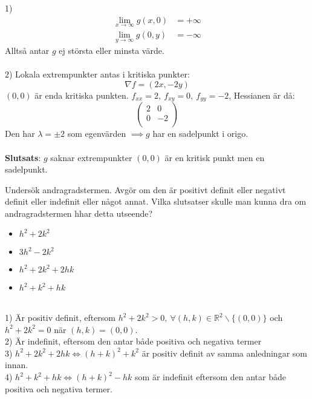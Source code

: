 \documentclass{report}
\begin{document}
{
1)
\begin{align*}
	\lim_{x \to \infty} g(x,0) &= + \infty\\
	\lim_{y \to \infty} g(0,y) &= - \infty
\end{align*}
Alltså antar $ g $ ej största eller minsta värde.\\\\

2) Lokala extrempunkter antas i kritiska punkter:
\begin{equation*}
\nabla f = (2x, -2y)
\end{equation*}
$ (0,0) $ är enda kritiska punkten. $ f_{xx} = 2, \: f_{xy} = 0, \: f_{yy} = -2 $, Hessianen är då:
\begin{equation*}
\begin{pmatrix}
	2 & 0 \\
	0 & -2 \\
\end{pmatrix}
\end{equation*}
Den har $ \lambda = \pm 2 $ som egenvärden $ \implies  g$ har en sadelpunkt i origo.\\\\

\textbf{Slutsats}: $ g $ saknar extrempunkter $ (0,0) $ är en kritisk punkt men en sadelpunkt. 
}

\qs{}
{
Undersök andragradstermen. Avgör om den är positivt definit eller negativt definit eller indefinit eller något annat. Vilka slutsatser skulle man kunna dra om andragradstermen hhar detta utseende?
\begin{itemize}
	\item $ h^2+2k^2 $
	\item $ 3h^2-2k^2 $
	\item $h^2+2k^2+2hk$
	\item $ h^2+k^2+hk $ 
\end{itemize}
}

\sol \\
1) Är positiv definit, eftersom $ h^2+2k^2 > 0, \: \forall (h,k) \in \mathbb{R}^2 \backslash \{(0,0)\} $ och $ h^2+2k^2 = 0 $ när $ (h,k) = (0,0) $.\\
2) Är indefinit, eftersom den antar både positiva och negativa termer\\
3) $ h^2+2k^2+2hk \iff (h+k)^2+k^2  $ är positiv definit av samma anledningar som innan.\\
4) $ h^2+k^2+hk \iff (h+k)^2 -hk  $ som är indefinit eftersom den antar både positiva och negativa termer.
\end{document}
